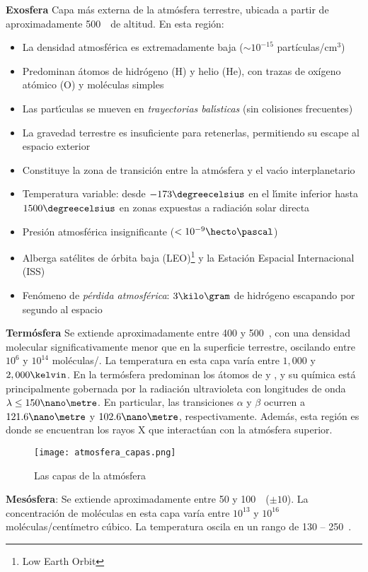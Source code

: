 \textbf{Exosfera}  Capa más externa de la atmósfera terrestre, ubicada a partir de aproximadamente 500~\kilo\metre\ de altitud. En esta región:
\begin{itemize}
    \item La densidad atmosférica es extremadamente baja ($\sim 10^{-15}$ partículas/cm$^3$)
    \item Predominan \'atomos de hidr\'ogeno (H) y helio (He), con trazas de ox\'igeno at\'omico (O) y mol\'eculas simples
    \item Las part\'{\i}culas se mueven en \textit{trayectorias bal\'{\i}sticas} (sin colisiones frecuentes)
    \item La gravedad terrestre es insuficiente para retenerlas, permitiendo su escape al espacio exterior
    \item Constituye la zona de transici\'on entre la atm\'osfera y el vac\'{\i}o interplanetario
    \item Temperatura variable: desde $-173\degreecelsius$ en el l\'{\i}mite inferior hasta $1500\degreecelsius$ en zonas expuestas a radiaci\'on solar directa
    \item Presi\'on atmosf\'erica insignificante ($< 10^{-9}\hecto\pascal$)
    \item Alberga sat\'elites de \'orbita baja (LEO)\footnote{Low Earth Orbit} y la Estaci\'on Espacial Internacional (ISS)
    \item Fen\'omeno de \textit{p\'erdida atmosf\'erica}: $3 \kilo\gram$ de hidr\'ogeno escapando por segundo al espacio
\end{itemize}


\textbf{ Term\'osfera }Se extiende aproximadamente entre 400 y 500~\kilo\metre, con una densidad molecular significativamente menor que en la superficie terrestre, oscilando entre $10^6$ y $10^{14}$ moléculas/\centi\cubic\metre. La temperatura en esta capa varía entre $1,000$ y $2,000\kelvin$.  
En la termósfera predominan los átomos de  y , y su química está principalmente gobernada por la radiación ultravioleta con longitudes de onda $\lambda \leq 150\nano\metre$. En particular, las transiciones $\alpha$ y $\beta$ ocurren a $121.6\nano\metre$   y $102.6\nano\metre$, respectivamente. Además, esta región es donde se encuentran los rayos X que interactúan con la atmósfera superior.
 \begin{wrapfigure}[26]{r}{35mm}
\centering
\texttt{[image: atmosfera\_capas.png]}
\caption{Las capas de la atm\'osfera}
\label{capasATM}
\end{wrapfigure}
\textbf{Mesósfera}: Se extiende aproximadamente entre 50 y 100~\kilo\metre~($\pm10$). La concentración de moléculas en esta capa varía entre $10^{13}$ y $10^{16}$ moléculas/centímetro cúbico. La temperatura oscila en un rango de 130 -- 250~\kelvin.  

